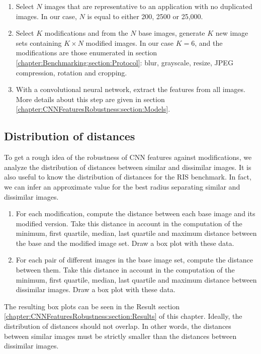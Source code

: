 \begin{enumerate}
	\item Select $N$ images that are representative to an application with no duplicated images. In our case, $N$ is equal to either 200, 2500 or 25,000.
	\item Select $K$ modifications and from the $N$ base images, generate $K$ new image sets containing $K \times N$ modified images. In our case $K=6$, and the modifications are those enumerated in section \ref{chapter:Benchmarking:section:Protocol}: blur, grayscale, resize, JPEG compression, rotation and cropping.
	\item With a convolutional neural network, extract the features from all images. More details about this step are given in section \ref{chapter:CNNFeaturesRobustness:section:Models}.
\end{enumerate}

\subsection{Distribution of distances}
To get a rough idea of the robustness of CNN features against modifications, we analyze the distribution of distances between similar and dissimilar images. It is also useful to know the distribution of distances for the RIS benchmark. In fact, we can infer an approximate value for the best radius separating similar and dissimilar images.

\begin{enumerate}
	\item For each modification, compute the distance between each base image and its modified version. Take this distance in account in the computation of the minimum, first quartile, median, last quartile and maximum distance between the base and the modified image set. Draw a box plot with these data.
	\item For each pair of different images in the base image set, compute the distance between them.  Take this distance in account in the computation of the minimum, first quartile, median, last quartile and maximum distance between dissimilar images. Draw a box plot with these data.
\end{enumerate}

The resulting box plots can be seen in the Result section \ref{chapter:CNNFeaturesRobustness:section:Results} of this chapter. Ideally, the distribution of distances should not overlap. In other words, the distances between similar images must be strictly smaller than the distances between dissimilar images.

